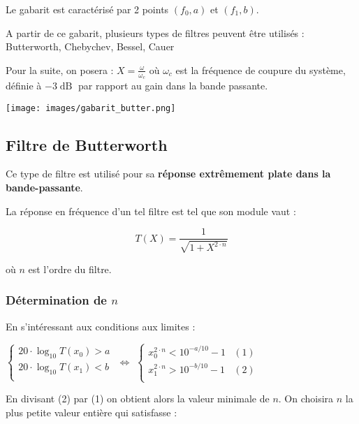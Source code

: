 \documentclass[a4paper,french]{paper}
\begin{document}
Le gabarit est caractérisé par 2 points $(f_0, a)$ et $(f_1, b)$.

\medskip

A partir de ce gabarit, plusieurs types de filtres peuvent être utilisés : Butterworth, Chebychev, Bessel, Cauer

\bigskip

Pour la suite, on posera : $X = \frac{\omega}{\omega_c}$ où $\omega_c$ est la fréquence de coupure du système, définie à $-3\operatorname{dB}$ par rapport au gain dans la bande passante.


\begin{center}
	\texttt{[image: images/gabarit\_butter.png]}
\end{center}

\newpage
\subsection*{Filtre de Butterworth}

Ce type de filtre est utilisé pour sa \textbf{réponse extrêmement plate dans la bande-passante}.


La réponse en fréquence d'un tel filtre est tel que son module vaut :

$$ T(X) = \frac{1}{\sqrt{1 + X^{2\cdot n}}}$$

où $n$ est l'ordre du filtre.

\subsubsection*{Détermination de $n$}
En s'intéressant aux conditions aux limites :


$
\left\{
    \begin{array}{ll}
        20 \cdot \log_{10} T(x_0) > a \\
        20 \cdot \log_{10} T(x_1) < b \\
    \end{array}    
\right. 
$
$\Leftrightarrow$
$
\left\{
    \begin{array}{ll}
        x_0^{2\cdot n} < 10^{-a/10} - 1 & (1)\\
        x_1^{2\cdot n} > 10^{-b/10} - 1 & (2)\\
    \end{array}    
\right. 
$

\medskip

En divisant (2) par (1) on obtient alors la valeur minimale de $n$. On choisira $n$ la plus petite valeur entière qui satisfasse :
\end{document}
